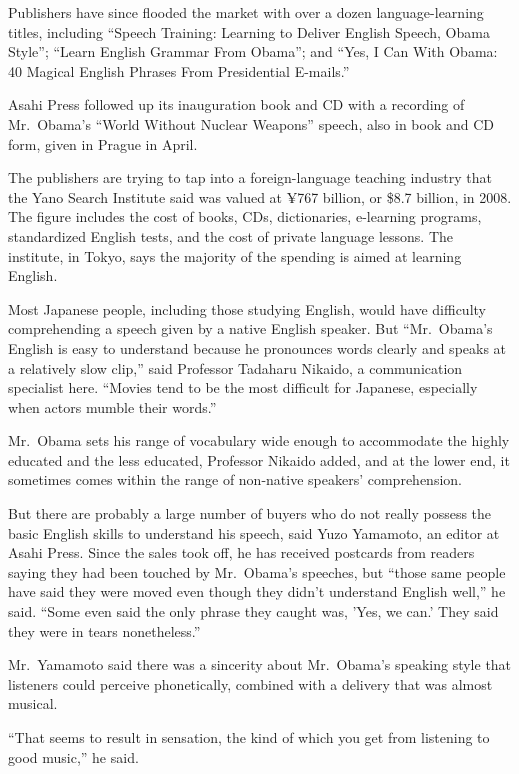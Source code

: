 ﻿\documentclass[12pt]{article}
\begin{document}
Publishers have since flooded the market with over a dozen language-learning titles, including
``Speech Training: Learning to Deliver English Speech, Obama Style''; ``Learn English Grammar From
Obama''; and ``Yes, I Can With Obama: 40 Magical English Phrases From Presidential E-mails.''

Asahi Press followed up its inauguration book and CD with a recording of Mr.~Obama's ``World Without
Nuclear Weapons'' speech, also in book and CD form, given in Prague in April.

The publishers are trying to tap into a foreign-language teaching industry that the Yano Search
Institute said was valued at ¥767 billion, or \$8.7 billion, in 2008. The figure includes the cost
of books, CDs, dictionaries, e-learning programs, standardized English tests, and the cost of
private language lessons. The institute, in Tokyo, says the majority of the spending is aimed at
learning English.

Most Japanese people, including those studying English, would have difficulty comprehending a speech
given by a native English speaker. But ``Mr.~Obama's English is easy to understand because he
pronounces words clearly and speaks at a relatively slow clip,'' said Professor Tadaharu Nikaido, a
communication specialist here. ``Movies tend to be the most difficult for Japanese, especially when
actors mumble their words.''

Mr.~Obama sets his range of vocabulary wide enough to accommodate the highly educated and the less
educated, Professor Nikaido added, and at the lower end, it sometimes comes within the range of
non-native speakers' comprehension.

But there are probably a large number of buyers who do not really possess the basic English skills
to understand his speech, said Yuzo Yamamoto, an editor at Asahi Press. Since the sales took off, he
has received postcards from readers saying they had been touched by Mr.~Obama's speeches, but
``those same people have said they were moved even though they didn't understand English well,'' he
said. ``Some even said the only phrase they caught was, 'Yes, we can.' They said they were in tears
nonetheless.''

Mr.~Yamamoto said there was a sincerity about Mr.~Obama's speaking style that listeners could
perceive phonetically, combined with a delivery that was almost musical.

``That seems to result in sensation, the kind of which you get from listening to good music,'' he
said.
\end{document}
